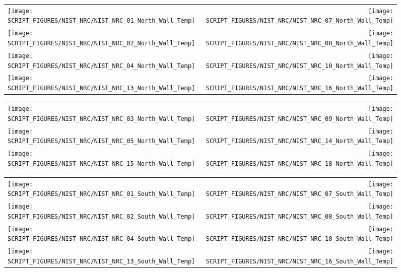 \begin{figure}[!ht]
\begin{tabular*}{\textwidth}{l@{\extracolsep{\fill}}r}
\texttt{[image: SCRIPT\_FIGURES/NIST\_NRC/NIST\_NRC\_01\_North\_Wall\_Temp]} &
\texttt{[image: SCRIPT\_FIGURES/NIST\_NRC/NIST\_NRC\_07\_North\_Wall\_Temp]} \\
\texttt{[image: SCRIPT\_FIGURES/NIST\_NRC/NIST\_NRC\_02\_North\_Wall\_Temp]} &
\texttt{[image: SCRIPT\_FIGURES/NIST\_NRC/NIST\_NRC\_08\_North\_Wall\_Temp]} \\
\texttt{[image: SCRIPT\_FIGURES/NIST\_NRC/NIST\_NRC\_04\_North\_Wall\_Temp]} &
\texttt{[image: SCRIPT\_FIGURES/NIST\_NRC/NIST\_NRC\_10\_North\_Wall\_Temp]} \\
\texttt{[image: SCRIPT\_FIGURES/NIST\_NRC/NIST\_NRC\_13\_North\_Wall\_Temp]} &
\texttt{[image: SCRIPT\_FIGURES/NIST\_NRC/NIST\_NRC\_16\_North\_Wall\_Temp]}
\end{tabular*}
\label{NIST_NRC_North_Wall_Temp_Closed}
\end{figure}

\begin{figure}[!ht]
\begin{tabular*}{\textwidth}{l@{\extracolsep{\fill}}r}
\texttt{[image: SCRIPT\_FIGURES/NIST\_NRC/NIST\_NRC\_03\_North\_Wall\_Temp]} &
\texttt{[image: SCRIPT\_FIGURES/NIST\_NRC/NIST\_NRC\_09\_North\_Wall\_Temp]} \\
\texttt{[image: SCRIPT\_FIGURES/NIST\_NRC/NIST\_NRC\_05\_North\_Wall\_Temp]} &
\texttt{[image: SCRIPT\_FIGURES/NIST\_NRC/NIST\_NRC\_14\_North\_Wall\_Temp]} \\
\texttt{[image: SCRIPT\_FIGURES/NIST\_NRC/NIST\_NRC\_15\_North\_Wall\_Temp]} &
\texttt{[image: SCRIPT\_FIGURES/NIST\_NRC/NIST\_NRC\_18\_North\_Wall\_Temp]}
\end{tabular*}
\label{NIST_NRC_North_Wall_Temp_Open}
\end{figure}

\begin{figure}[!ht]
\begin{tabular*}{\textwidth}{l@{\extracolsep{\fill}}r}
\texttt{[image: SCRIPT\_FIGURES/NIST\_NRC/NIST\_NRC\_01\_South\_Wall\_Temp]} &
\texttt{[image: SCRIPT\_FIGURES/NIST\_NRC/NIST\_NRC\_07\_South\_Wall\_Temp]} \\
\texttt{[image: SCRIPT\_FIGURES/NIST\_NRC/NIST\_NRC\_02\_South\_Wall\_Temp]} &
\texttt{[image: SCRIPT\_FIGURES/NIST\_NRC/NIST\_NRC\_08\_South\_Wall\_Temp]} \\
\texttt{[image: SCRIPT\_FIGURES/NIST\_NRC/NIST\_NRC\_04\_South\_Wall\_Temp]} &
\texttt{[image: SCRIPT\_FIGURES/NIST\_NRC/NIST\_NRC\_10\_South\_Wall\_Temp]} \\
\texttt{[image: SCRIPT\_FIGURES/NIST\_NRC/NIST\_NRC\_13\_South\_Wall\_Temp]} &
\texttt{[image: SCRIPT\_FIGURES/NIST\_NRC/NIST\_NRC\_16\_South\_Wall\_Temp]}
\end{tabular*}
\label{NIST_NRC_South_Wall_Temp_Closed}
\end{figure}

